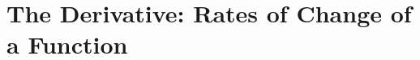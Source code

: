 \chapter{The Derivative: Rates of Change of a Function}
\label{ch:derivatives}

%
%
%
%
%
%
%
%
%
%
